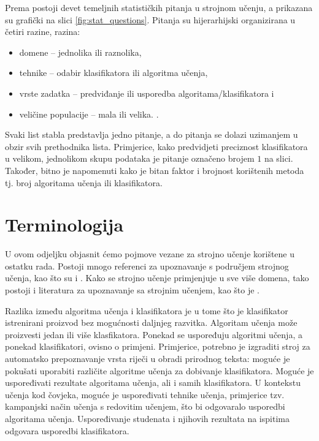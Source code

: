 Prema \citep{dietterich1998approximate} postoji devet temeljnih statističkih pitanja u strojnom učenju, a prikazana su grafički na slici \ref{fig:stat_questions}. Pitanja su hijerarhijski organizirana u četiri razine, razina: 
\begin{itemize}
\item domene -- jednolika ili raznolika,
\item tehnike -- odabir klasifikatora ili algoritma učenja,
\item vrste zadatka -- predviđanje ili usporedba algoritama/klasifikatora i 
\item veličine populacije -- mala ili velika.
 . 
\end{itemize}
Svaki list stabla predstavlja jedno pitanje, a do pitanja se dolazi uzimanjem u obzir svih prethodnika lista. Primjerice, kako predvidjeti preciznost klasifikatora u velikom, jednolikom skupu podataka je pitanje označeno brojem $1$ na slici. Također, bitno je napomenuti kako je bitan faktor i brojnost korištenih metoda tj. broj algoritama učenja ili klasifikatora. %


\section{Terminologija}

U ovom odjeljku objasnit ćemo pojmove vezane za strojno učenje korištene u ostatku rada. Postoji mnogo referenci za upoznavanje s područjem strojnog učenja, kao što su \citep{anderson1986machine} i \citep{bishop2006pattern}. Kako se strojno učenje primjenjuje u sve više domena, tako postoji i literatura za upoznavanje sa strojnim učenjem, kao što je \citep{baldi2001bioinformatics}. 

Razlika između algoritma učenja i klasifikatora je u tome što je klasifikator istrenirani proizvod bez mogućnosti daljnjeg razvitka. Algoritam učenja može proizvesti jedan ili više klasfikatora. Ponekad se uspoređuju algoritmi učenja, a ponekad klasifikatori, ovisno o primjeni. Primjerice, potrebno je izgraditi stroj za automatsko prepoznavanje vrsta riječi u obradi prirodnog teksta: moguće je pokušati uporabiti različite algoritme učenja za dobivanje klasifikatora. Moguće je uspoređivati rezultate algoritama učenja, ali i samih klasifikatora. U kontekstu učenja kod čovjeka, moguće je uspoređivati tehnike učenja, primjerice tzv. kampanjski način učenja s redovitim učenjem, što bi odgovaralo usporedbi algoritama učenja. Uspoređivanje studenata i njihovih rezultata na ispitima odgovara usporedbi klasifikatora.

